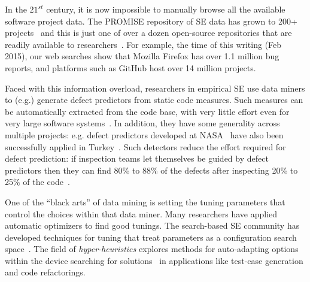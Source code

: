 \documentclass{sig-alternative}
\begin{document}
In the $21^{st}$ century, it is now impossible
to manually browse all the available software project
data. The PROMISE repository of SE data has grown to 200+ projects~\cite{promise15}
and this is just one of over a dozen open-source repositories
that are readily available to researchers~\cite{rod12}.
For example,  the time of this writing (Feb  2015), our web searches show that Mozilla Firefox has over 1.1 million bug reports, and platforms such as GitHub host over 14 million projects. 



 
Faced with this information overload,
researchers in empirical SE
use  data miners  to (e.g.) generate 
defect predictors from static code measures.
Such   measures can be
automatically extracted from the code base, with very little effort
even for very large software systems~\cite{nagappan05}. 
In addition, they have  some generality
across multiple projects: e.g. defect
predictors developed at NASA~\cite{me07b} have also been successfully
applied in Turkey~\cite{tosun09}.
Such detectors reduce the effort required for 
defect prediction: if 
inspection teams let themselves be guided by defect predictors then
they can find 80\% to 88\% of the defects
after inspecting  20\% to 25\% of the code~\cite{ostrand04,tosun10}.


One of the ``black arts'' of data mining is setting the tuning
parameters that control  the choices within that data miner.
Many researchers have applied automatic optimizers to find good tunings.
The search-based SE community has   developed techniques
for tuning that treat parameters  as a configuration
search space~\cite{cora10,Krogmann10}. 
The field of {\em hyper-heuristics} explores methods for auto-adapting
options within the device searching for solutions~\cite{jia2013learning} in applications
like test-case generation and code refactorings.
\end{document}
